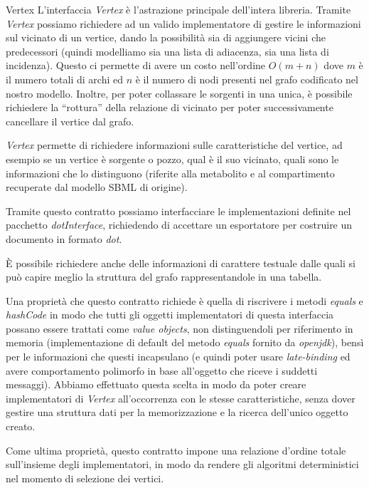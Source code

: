 \begin{paragraph}{Vertex}
  L'interfaccia \emph{Vertex} \`e l'astrazione principale dell'intera
  libreria.  Tramite \emph{Vertex} possiamo richiedere ad un valido
  implementatore di gestire le informazioni sul vicinato di un
  vertice, dando la possibilit\`a sia di aggiungere vicini che
  predecessori (quindi modelliamo sia una lista di adiacenza, sia una
  lista di incidenza). Questo ci permette di avere un costo
  nell'ordine $O(m + n)$ dove $m$ \`e il numero totali di archi ed $n$
  \`e il numero di nodi presenti nel grafo codificato nel nostro
  modello. Inoltre, per poter collassare le sorgenti in una unica, \`e
  possibile richiedere la ``rottura'' della relazione di vicinato per
  poter successivamente cancellare il vertice dal grafo.

  \emph{Vertex} permette di richiedere informazioni sulle
  caratteristiche del vertice, ad esempio se un vertice \`e sorgente o
  pozzo, qual \`e il suo vicinato, quali sono le informazioni che lo
  distinguono (riferite alla metabolito e al compartimento recuperate
  dal modello SBML di origine).

  Tramite questo contratto possiamo interfacciare le implementazioni
  definite nel pacchetto \emph{dotInterface}, richiedendo di accettare
  un esportatore per costruire un documento in formato \emph{dot}.

  \`E possibile richiedere anche delle informazioni di carattere
  testuale dalle quali si pu\`o capire meglio la struttura del grafo
  rappresentandole in una tabella.

  Una propriet\`a che questo contratto richiede \`e quella di
  riscrivere i metodi \emph{equals} e \emph{hashCode} in modo che
  tutti gli oggetti implementatori di questa interfaccia possano
  essere trattati come \emph{value objects}, non distinguendoli per
  riferimento in memoria (implementazione di default del metodo
  \emph{equals} fornito da \emph{openjdk}), bens\`i per le
  informazioni che questi incapsulano (e quindi poter usare
  \emph{late-binding} ed avere comportamento polimorfo in base
  all'oggetto che riceve i suddetti messaggi). Abbiamo effettuato
  questa scelta in modo da poter creare implementatori di
  \emph{Vertex} all'occorrenza con le stesse caratteristiche, senza
  dover gestire una struttura dati per la memorizzazione e la ricerca
  dell'unico oggetto creato.

  Come ultima propriet\`a, questo contratto impone una relazione
  d'ordine totale sull'insieme degli implementatori, in modo da
  rendere gli algoritmi deterministici nel momento di selezione dei
  vertici.
\end{paragraph}


